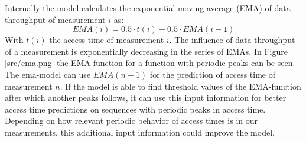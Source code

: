 \documentclass{superfri}
\begin{document}
	Internally the model calculates the exponential moving average (EMA) of data throughput of measurement $i$ as:
	\begin{equation}
	EMA(i) = 0.5 \cdot t(i)+ 0.5 \cdot EMA(i-1)
	\end{equation}
	With $t(i)$ the access time of measurement $i$.
	The influence of data throughput of a measurement is exponentially decreasing in the series of EMAs.
	In Figure \ref{src/ema.png} the EMA-function for a function with periodic peaks can be seen.
	The ema-model can use $EMA(n-1)$ for the prediction of access time of measurement $n$.
	If the model is able to find threshold values of the EMA-function after which another peaks follows, it can use this input information for better access time predictions on sequences with periodic peaks in access time. Depending on how relevant periodic behavior of access times is in our measurements, this additional input information could improve the model.
	\medskip
	
\end{document}
